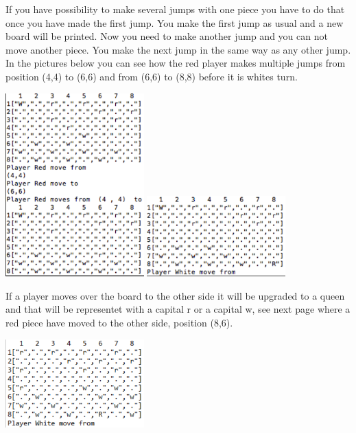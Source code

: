 \documentclass[12pt,a4paper]{article}
\begin{document}
If you have possibility to make several jumps with one piece you have to do that once you have made the first jump. You make the first jump as usual and a new board will be printed. Now you need to make another jump and you can not move another piece. You make the next jump in the same way as any other jump. In the pictures below you can see how the red player makes multiple jumps from position (4,4) to (6,6) and from (6,6) to (8,8) before it is whites turn.

\begin{center}
	\includegraphics[width= 0.4\textwidth]{mj1.PNG} \includegraphics[width= 0.4\textwidth]{mj2.PNG}
\end{center}


If a player moves over the board to the other side it will be upgraded to a queen and that will be representet with a capital r or a capital w, see next page where a red piece have moved to the other side, position (8,6).

\begin{center}
	\includegraphics[width= 0.4\textwidth]{queen.PNG}
\end{center}
\end{document}
